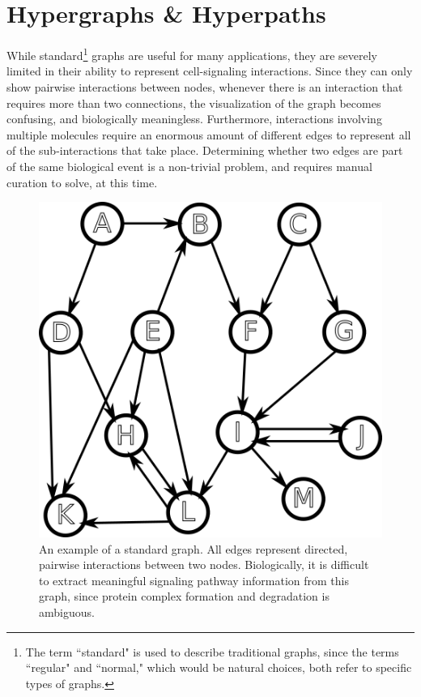 \documentclass[12pt,twoside]{reedthesis}
\theoremstyle{definition}
\begin{document}
\chapter{Hypergraphs \& Hyperpaths}

While standard\footnote{The term ``standard" is used to describe traditional graphs, since the terms ``regular" and ``normal," which would be natural choices, both refer to specific types of graphs.} graphs are useful for many applications, they are severely limited in their ability to represent cell-signaling interactions.  Since they can only show pairwise interactions between nodes, whenever there is an interaction that requires more than two connections, the visualization of the graph becomes confusing, and biologically meaningless.  Furthermore, interactions involving multiple molecules require an enormous amount of different edges to represent all of the sub-interactions that take place.  Determining whether two edges are part of the same biological event is a non-trivial problem, and requires manual curation to solve, at this time.\par

\begin{figure}[thbp]
  \begin{center}
    \includegraphics{example-standard-graph}
  \caption{An example of a standard graph. All edges represent directed, pairwise interactions between two nodes. Biologically, it is difficult to extract meaningful signaling pathway information from this graph, since protein complex formation and degradation is ambiguous.}
  \label{fig:example-standard-graph}
  \end{center}
\end{figure}
\end{document}
